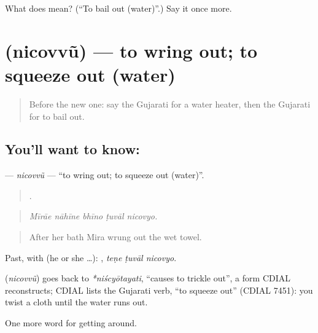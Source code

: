 \begin{tcolorbox}[breakable,colback=teal!4,colframe=teal!35!black,title={Before you move on}]
What does  mean? (\textquotedblleft{}To bail out (water)\textquotedblright{}.) Say it once more.
\end{tcolorbox}
\section[\texorpdfstring{\gu{નિચોવવું} (nicovvũ)}{નિચોવવું (nicovvũ)}]{ (nicovvũ) — to wring out; to squeeze out (water)}

\label{lesson:GU-C410-nicovvu}



\begin{quote}
Before the new one: say the Gujarati for a water heater, then the Gujarati for to bail out.
\end{quote}

\subsection*{You'll want to know: }
\textbf{} — \emph{nicovvũ} — \textquotedblleft{}to wring out; to squeeze out (water)\textquotedblright{}.

\begin{quote}
    .
\end{quote}

\begin{quote}
\emph{Mīrāe nāhīne bhīno ṭuvāl nicovyo.}
\end{quote}

\begin{quote}
After her bath Mira wrung out the wet towel.
\end{quote}

Past, with  (he or she …):   , \emph{teṇe ṭuvāl nicovyo}.

\begin{cousinweb}
\textbf{} (\emph{nicovvũ}) goes back to \emph{*niścyōtayati}, \textquotedblleft{}causes to trickle out\textquotedblright{}, a form CDIAL reconstructs; CDIAL lists the Gujarati verb, \textquotedblleft{}to squeeze out\textquotedblright{} (CDIAL 7451): you twist a cloth until the water runs out.
\end{cousinweb}

\begin{grammarlens}[title={What you've built}]
One more word for getting around.
\end{grammarlens}

